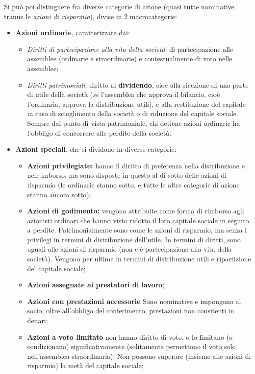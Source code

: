\documentclass[a4paper,11pt]{article}
\begin{document}
Si può poi distinguere fra diverse categorie di azione (quasi tutte nominative tranne le \textit{azioni di risparmio}), divise in 2 macrocategorie:
\begin{itemize}
	\item \textbf{Azioni ordinarie}, caratterizzate dai:
	\begin{itemize}
		\item \textit{Diritti di partecipazione alla vita della società}: di partecipazione alle assemblee (ordinarie e straordinarie) e contestualmente di voto nelle assemblee;
		\item \textit{Diritti patrimoniali}: diritto al \textbf{dividendo}, cioè alla ricezione di una parte di utile della società (\textit{se} l'assemblea che approva il bilancio, cioè l'ordinaria, approva la distribuzione utili), e alla restituzione del capitale in caso di scioglimento della società o di riduzione del capitale sociale.
			Sempre dal punto di vista patrimoniale, chi detiene azioni ordinarie ha l'obbligo di concorrere alle perdite della società. 
	\end{itemize}
	\item \textbf{Azioni speciali}, che si dividono in diverse categorie:
		\begin{itemize}
			\item \textbf{Azioni privilegiate:} hanno il diritto di preferenza nella distribuzione e nelr imborso, ma sono disposte in questo al di sotto delle azioni di risparmio (le ordinarie stanno sotto, e tutte le altre categorie di azione stanno ancora sotto); 
			\item \textbf{Azioni di godimento:} vengono attribuite come forma di rimborso agli azionisti ordinari che hanno visto ridotto il loro capitale sociale in seguito a perdite. Patrimonialmente sono come le azioni di risparmio, ma senza i privilegi in termini di distribuzione dell'utile. In termini di diritti, sono uguali alle azioni di risparmio (non c'è partecipazione alla vita della società). Vengono per ultime in termini di distribuzione utili e ripartizione del capitale sociale;
			\item \textbf{Azioni assegnate ai prestatori di lavoro};
			\item \textbf{Azioni con prestazioni accessorie} Sono nominative e impongono al socio, oltre all'obbligo del conferimento, prestazioni non consitenti in denari;
			\item \textbf{Azioni a voto limitato} non hanno diritto di voto, o lo limitano (o condizionano) significativamente (solitamente permettono il voto solo nell'assemblea straordinaria). Non possono superare (insieme alle azioni di risparmio) la metà del capitale sociale;

\end{itemize}
\end{itemize}
\end{document}
